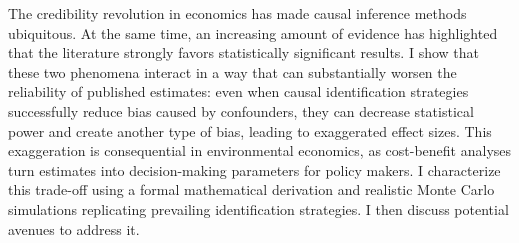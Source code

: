 The credibility revolution in economics has made causal inference methods ubiquitous. At the same time, an increasing amount of evidence has highlighted that the literature strongly favors statistically significant results. I show that these two phenomena interact in a way that can substantially worsen the reliability of published estimates: even when causal identification strategies successfully reduce bias caused by confounders, they can decrease statistical power and create another type of bias, leading to exaggerated effect sizes. This exaggeration is consequential in environmental economics, as cost-benefit analyses turn estimates into decision-making parameters for policy makers. I characterize this trade-off using a formal mathematical derivation and realistic Monte Carlo simulations replicating prevailing identification strategies. I then discuss potential avenues to address it. 

		
		
		
		
		
